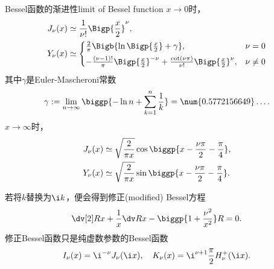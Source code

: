 \begin{example}{Bessel函数的渐进性}{limit of Bessel function}
    $x\to 0$时， 
    \begin{align*}
        J_\nu(x)&\simeq\frac1{\nu!}\Bigp{\frac x2}^\nu,\quad\\
        Y_\nu(x)&\simeq
        \begin{cases}
            \frac2\pi\Bigb{\ln\Bigp{\frac x2}+\gamma},&\nu=0\\[1ex]
            -\frac{(\nu-1)!}\pi\Bigp{\frac x2}^{-\nu}+\frac{\cot(\nu\pi)}{\nu!}\Bigp{\frac x2}^\nu,&\nu\neq 0
        \end{cases}
    \end{align*}
    其中$\gamma$是Euler-Mascheroni常数
    \[
        \gamma:=\lim_{n\to\infty}\biggp{-\ln n+\sum_{k=1}^n\frac1k}=\num{0.5772156649}\ldots.
    \]
    \tcblower
    $x\to\infty$时， 
    \begin{align*}
        J_\nu(x)&\simeq\sqrt{\frac2{\pi x}}\cos\biggp{x-\frac{\nu\pi}2-\frac\pi{4}},\\
        Y_\nu(x)&\simeq\sqrt{\frac2{\pi x}}\sin\biggp{x-\frac{\nu\pi}2-\frac\pi{4}}.
    \end{align*}
\end{example}
若将$k$替换为$\i k$，便会得到修正(modified) Bessel方程
\[
    \dv[2]Rx+\frac1x\dv Rx-\biggp{1+\frac{\nu^2}{x^2}}R=0.
\]
修正Bessel函数只是纯虚数参数的Bessel函数
\[
    I_\nu(x)=\i^{-\nu}J_\nu(\i x),\quad K_\nu(x)=\i^{\nu+1}\frac\pi 2H_\nu^+(\i x).
\]

